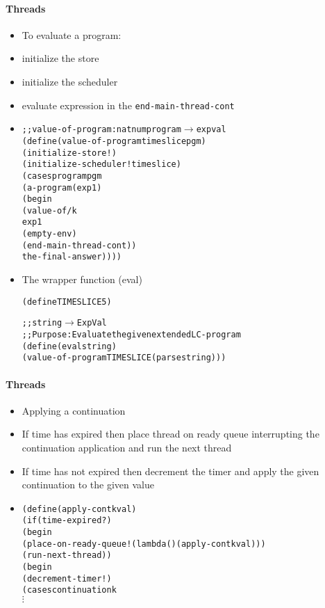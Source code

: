 \documentclass{beamer}
\newcommand{\arrow}{\(\rightarrow\)}
\newcommand{\vdotss}{\(\vdots\)}
\begin{document}
\begin{frame}[fragile]
\framesubtitle{Threads}
\begin{scriptsize}
\begin{itemize}
\item<1-> To evaluate a program:

\item<1-> initialize the store

\item<1-> initialize the scheduler

\item<1-> evaluate expression in the \texttt{end-main-thread-cont}

\item<2->
\begin{alltt}
;; value-of-program : natnum program \arrow{} expval
(define (value-of-program timeslice pgm)
  (initialize-store!)
  (initialize-scheduler! timeslice)
  (cases program pgm
    (a-program (exp1)
               (begin
                 (value-of/k
                  exp1
                  (empty-env)
                  (end-main-thread-cont))
                 the-final-answer))))
\end{alltt}

\item<3-> The wrapper function (eval)
\begin{alltt}
(define TIMESLICE 5)

;; string \arrow{} ExpVal
;; Purpose: Evaluate the given extended LC-program
(define (eval string)
  (value-of-program TIMESLICE (parse string)))
\end{alltt}

\end{itemize}
\end{scriptsize}
\end{frame}

\begin{frame}[fragile]
\framesubtitle{Threads}
\begin{scriptsize}
\begin{itemize}
\item<1-> Applying a continuation

\item<1-> If time has expired then place thread on ready queue interrupting the continuation application and run the next thread

\item<2-> If time has not expired then decrement the timer and apply the given continuation to the given value 
    
\item<3->
\begin{alltt}
(define (apply-cont k val)
  (if (time-expired?)
      (begin
        (place-on-ready-queue! (lambda () (apply-cont k val)))
        (run-next-thread))
      (begin
        (decrement-timer!)
        (cases continuation k
           \vdotss{}
\end{alltt}

\end{itemize}
\end{scriptsize}
\end{frame}
\end{document}

